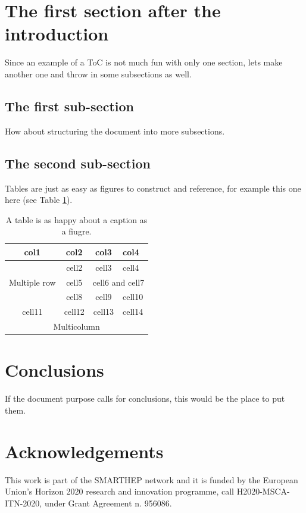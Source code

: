 \documentclass{smarthepnote}
\begin{document}
\section{The first section after the introduction}
Since an example of a ToC is not much fun with only one section, lets make another one and throw in some subsections as well.


\subsection{The first sub-section}
How about structuring the document into more subsections.

\subsection{The second sub-section}
Tables are just as easy as figures to construct and reference, for example this one here (see Table \ref{tab:exampletable}).

\begin{table}[h]
\begin{center}
\begin{tabular}{ |c|c|c|p{}| } 
    \hline
    \rowcolor{lightgray} 
    col1 & col2 & col3 & col4\\
    \hline
    \multirow{3}{4em}{Multiple row} & cell2 & cell3 & cell4 \\ 
    \cline{3-4}
    & cell5 & \multicolumn{2}{c|}{cell6 and cell7} \\
    \cline{3-4}
    & cell8 & cell9 & cell10 \\ 
    \hline
    cell11 & cell12 & cell13 & cell14 \\ 
    \hline
    \multicolumn{4}{|c|}{ Multicolumn} \\
    \hline
\end{tabular}
\end{center}
\caption{A table is as happy about a caption as a fiugre.}
\label{tab:exampletable}
\end{table}

\section{Conclusions}
If the document purpose calls for conclusions, this would be the place to put them.

\section*{Acknowledgements}
This work is part of the SMARTHEP network and it is funded by the European Union’s Horizon 2020 research and innovation programme, call H2020-MSCA-ITN-2020, under Grant Agreement n. 956086. 



\end{document}
